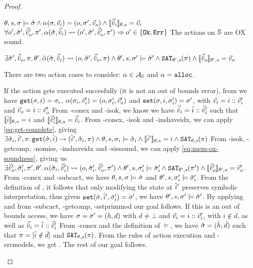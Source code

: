 \begin{proof}


\pfassume \begin{hypvlist}
 $\theta,s,\st\models\sst \land \ppexecc{\alpha}{\st,\ins}{o,\st',\outs} \land \expeval{\sins}=\ins$
 $\forall o', \sst', \souts', \pc'\ldotp \ppexec{\alpha}{\sst,\sins}{o',\sst',\souts',\pc'} \Rarr o' \in \{ \Ok, \Err \}$
 The actions on $\mmdl$ are OX sound.
\end{hypvlist}
\pfprove \begin{goalvlist}
 $\exists \sst',\souts,\pc,\theta'\ldotp \ppexec{\sym\alpha}{\sst,\sins}{o,\sst',\souts,\pc} \land \theta',s,\st'\models \sst' \land  \SAT[\theta',s](\pc) \land \expeval[\theta',s]{\souts}=\outs$
\end{goalvlist}

There are two action cases to consider: $\alpha\in\actions_\mmdl$ and $\alpha=\alloc$.

\pfcase{$\alpha\in\actions_\mmdl$}

\begin{hypvlist}
 If the action gets executed succesfully (it is not an out of bounds error), from  we have $\ppgetc{\st,i}{\st_i}$,  $\ppexecc{\alpha}{\st_i,\ins'}{o,\st'_i,\outs'}$ and $\ppset{\st,i,\st'_i}{\st'}$, with $\ins=i::\ins'$ and $\outs=i::\outs'$
 From \hyp{conex} and \hyp{isok}, we know we have $\sins=\sym i::\sins'$ such that $\expeval{\sym i}=i$ and $\expeval{\sins'}=\sins$.%
 From \hyp{conex}, \hyp{isok} and \hyp{inshaveidx}, we can apply \ref{eq:get-complete}, giving $\exists \sst_i, \sym i', \pc \ldotp \ppget{\sst,\sym i}{\sym i', \sst_i, \pc} \land \theta,s,\st_i\models\sst_i \land \expeval{\sym i'}=i \land \SAT(\pc)$
 From \hyp{isok}, \hyp{getcomp}, \hyp{nomiss}, \hyp{inshaveidx} and \hyp{sissound}, we can apply \ref{eq:mem-ox-soundness}, giving us $\exists \souts',\sst'_i,\pc',\theta'\ldotp \ppexec{\alpha}{\sst_i,\sins'}{o,\sst'_i,\souts',\pc'}\land \theta',s,\st_i'\models\sst_i' \land \SAT[\theta',s](\pc') \land \expeval[\theta',s]{\souts'}=\outs'$.%
 From \hyp{conex} and \hyp{subcact}, we have $\theta,s,\st\models\sst$ and $\theta',s,\st_i'\models\sst_i'$. From the definition of , it follows that only modifying the state at $\sym i'$ preserves symbolic interpretation, thus given $\ppset{\sst,\sym i',\sst_i'}{\sst'}$, we have $\theta',s,\st'\models\sst'$.
 By applying  and from \hyp{subcact}, \hyp{getcomp}, \hyp{sstprimmod} our goal  follows.
 If this is an out of bounds access, we have $\st=\st'=(h,d)$ with $d\neq\bot$ and $\ins=i::\ins'$, with $i\notin d$, as well as $\sins=\sym i::\sins'$ 
 From \hyp{conex} and the definition of $\models$, we have $\sst=(\sym h, \sym d)$ such that $\pc=[\sym i\notin \sym d]$ and $\SAT(\pc)$. 
 From the rules of action execution and \hyp{errmodels}, we get \ppexec{\alpha}{\sst,\sins}{\Err,\sst,[],\pc}. The rest of our goal  follows.
\end{hypvlist}


\end{proof}
